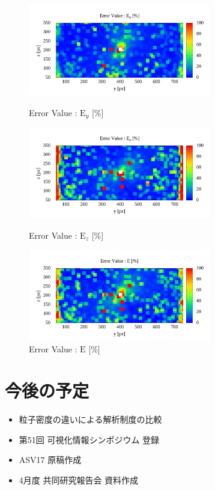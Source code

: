 \documentclass[twocolumn,a4j]{jsarticle}
\begin{document}
\begin{figure}[htbp]
  \footnotesize
  \begin{center}
    \includegraphics[width=80mm]{../images/error_y.png}
    \caption{Error Value : $\mathrm{E}_y$ [\%]}
    \includegraphics[width=80mm]{../images/error_z.png}
    \caption{Error Value : $\mathrm{E}_z$ [\%]}
    \includegraphics[width=80mm]{../images/error_value.png}
    \caption{Error Value : $\mathrm{E}$ [\%]}
  \end{center}
\end{figure}

\section{今後の予定}
\begin{itemize}
  \item 粒子密度の違いによる解析制度の比較
  \item 第51回 可視化情報シンポジウム 登録
  \item ASV17 原稿作成
  \item 4月度 共同研究報告会 資料作成
\end{itemize}
\end{document}
